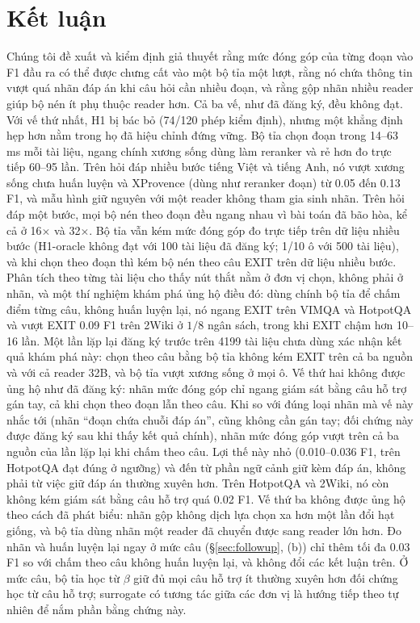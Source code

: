 \documentclass[11pt]{article}
\begin{document}
\section{Kết luận}
Chúng tôi đề xuất và kiểm định giả thuyết rằng mức đóng góp của từng đoạn vào F1 đầu ra
có thể được chưng cất vào một bộ tỉa một lượt, rằng nó chứa thông tin vượt quá nhãn
đáp án khi câu hỏi cần nhiều đoạn, và rằng gộp nhãn nhiều reader giúp bộ nén ít phụ thuộc
reader hơn. Cả ba vế, như đã đăng ký, đều không đạt. Với vế thứ nhất, H1 bị bác bỏ (74/120 phép kiểm định), nhưng một
khẳng định hẹp hơn nằm trong họ đã hiệu chỉnh đứng vững. Bộ tỉa chọn đoạn trong 14--63\,ms mỗi tài liệu, ngang chính
xương sống dùng làm reranker và rẻ hơn đo trực tiếp 60--95 lần. Trên hỏi đáp nhiều bước tiếng Việt và tiếng
Anh, nó vượt xương sống chưa huấn luyện và XProvence (dùng như reranker đoạn) từ 0.05 đến 0.13 F1, và mẫu hình giữ
nguyên với một reader
không tham gia sinh nhãn. Trên hỏi đáp một bước, mọi bộ nén theo đoạn đều ngang nhau vì bài toán đã bão hòa, kể
cả ở 16$\times$ và 32$\times$. Bộ tỉa vẫn kém mức đóng góp đo trực tiếp trên dữ liệu nhiều bước (H1-oracle không đạt
với 100 tài liệu đã đăng ký; 1/10 ô với 500 tài liệu), và khi chọn theo đoạn thì kém bộ nén theo câu EXIT trên dữ
liệu nhiều bước. Phân tích theo từng tài liệu cho thấy nút thắt nằm ở đơn vị chọn, không phải ở nhãn, và một
thí nghiệm khám phá ủng hộ điều đó: dùng chính bộ tỉa để chấm điểm từng câu, không huấn luyện lại, nó ngang
EXIT trên VIMQA và HotpotQA và vượt EXIT 0.09 F1 trên 2Wiki ở $1/8$ ngân sách, trong khi EXIT chậm hơn 10--16 lần.
Một lần lặp lại đăng ký trước trên 4199 tài liệu chưa dùng xác nhận kết quả khám phá này: chọn theo câu bằng bộ tỉa
không kém EXIT trên cả ba nguồn và với cả reader 32B, và bộ tỉa vượt xương sống ở mọi ô.
Vế thứ hai không được ủng hộ như đã đăng ký: nhãn mức đóng góp chỉ ngang giám sát bằng câu hỗ trợ gán tay, cả khi
chọn theo đoạn lẫn theo câu. Khi so với đúng loại nhãn mà vế này nhắc tới (nhãn ``đoạn chứa chuỗi đáp án'', cũng không
cần gán tay; đối chứng này được đăng ký sau khi thấy kết quả chính), nhãn mức đóng góp vượt trên cả ba nguồn của
lần lặp lại khi chấm theo câu. Lợi thế này nhỏ (0.010--0.036 F1, trên HotpotQA đạt đúng ở ngưỡng) và đến từ phần ngữ cảnh giữ kèm đáp án, không phải từ việc giữ đáp án thường xuyên hơn. Trên
HotpotQA và 2Wiki, nó còn không kém giám sát bằng câu hỗ trợ quá 0.02 F1. Vế thứ ba không được ủng hộ theo cách đã phát biểu: nhãn gộp không dịch lựa chọn xa hơn một
lần đổi hạt giống, và bộ tỉa dùng nhãn một reader đã chuyển được sang reader lớn hơn. Đo nhãn và huấn luyện lại
ngay ở mức câu (\S\ref{sec:followup}, (b)) chỉ thêm tối đa 0.03 F1 so với chấm theo câu không huấn luyện lại, và
không đổi các kết luận trên. Ở mức câu, bộ tỉa học từ $\beta$ giữ đủ mọi câu hỗ trợ ít thường xuyên hơn đối chứng
học từ câu hỗ trợ; surrogate có tương tác giữa các đơn vị là hướng tiếp theo tự nhiên để nắm phần bằng chứng này.
\end{document}
